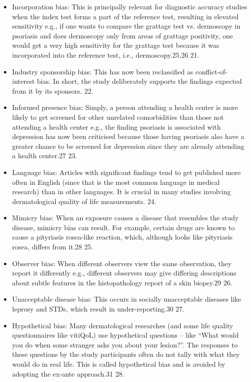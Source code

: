 \documentclass[12pt, a4paper, oneside]{book}   	%
\begin{document}
\begin{itemize}
				\item  Incorporation bias: This is principally relevant for diagnostic accuracy studies when the index test forms a part of the reference test, resulting in elevated sensitivity e.g., if one wants to compare the grattage test vs. dermoscopy in psoriasis and does dermoscopy only from areas of grattage positivity, one would get a very high sensitivity for the grattage test because it was incorporated into the reference test, i.e., dermoscopy.25,26 21.\autocite{Chakraborty_2023}
				\item  Industry sponsorship bias: This has now been reclassified as conflict-of-interest bias. In short, the study deliberately supports the findings expected from it by its sponsors. 22.\autocite{Chakraborty_2023}
				\item  Informed presence bias: Simply, a person attending a health center is more likely to get screened for other unrelated comorbidities than those not attending a health center e.g., the finding psoriasis is associated with depression has now been criticised because those having psoriasis also have a greater chance to be screened for depression since they are already attending a health center.27 23. \autocite{Chakraborty_2023}
				\item Language bias: Articles with significant findings tend to get published more often in English (since that is the most common language in medical research) than in other languages. It is crucial in many studies involving dermatological quality of life measurements. 24.\autocite{Chakraborty_2023}
				\item  Mimicry bias: When an exposure causes a disease that resembles the study disease, mimicry bias can result. For example, certain drugs are known to cause a pityriasis rosea-like reaction, which, although looks like pityriasis rosea, differs from it.28 25.\autocite{Chakraborty_2023}
				\item  Observer bias: When different observers view the same observation, they report it differently e.g., different observers may give differing descriptions about subtle features in the histopathology report of a skin biopsy.29 26. \autocite{Chakraborty_2023}
				\item Unacceptable disease bias: This occurs in socially unacceptable diseases like leprosy and STDs, which result in under-reporting.30 27. \autocite{Chakraborty_2023}
				\item Hypothetical bias: Many dermatological researches (and some life quality questionnaires like vitiQoL) use hypothetical questions – like “What would you do when some stranger asks you about your lesion?”. The responses to these questions by the study participants often do not tally with what they would do in real life. This is called hypothetical bias and is avoided by adopting the ex-ante approach.31 28.

\end{itemize}
\end{document}
